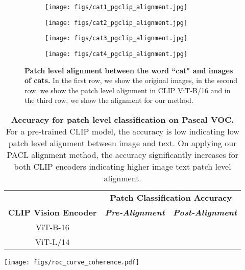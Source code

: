 \documentclass[10pt,twocolumn,letterpaper]{article}
\begin{document}
\begin{figure}[!t]
    \begin{subfigure}{0.25\linewidth}
        \centering
        \texttt{[image: figs/cat1\_pgclip\_alignment.jpg]}
\end{subfigure}
    \begin{subfigure}{0.25\linewidth}
        \centering
        \texttt{[image: figs/cat2\_pgclip\_alignment.jpg]}
\end{subfigure}
    \begin{subfigure}{0.28\linewidth}
        \centering
        \texttt{[image: figs/cat3\_pgclip\_alignment.jpg]}
\end{subfigure}
    \begin{subfigure}{0.14\linewidth}
        \centering
        \texttt{[image: figs/cat4\_pgclip\_alignment.jpg]}
\end{subfigure}
    \vspace{-2mm}
    \caption{\textbf{Patch level alignment between the word ``cat" and images of cats.} In the first row, we show the original images, in the second row, we show the patch level alignment in CLIP ViT-B/16 and in the third row, we show the alignment for our method.}
    \vspace{-4mm}
    \label{fig:alignment_qualitative}
\end{figure}



\begin{table}
    \centering
    \begin{minipage}{0.6\linewidth}
    \centering
    \scriptsize
    \resizebox{\linewidth}{!}
    {
    \begin{tabular}{ccc}
    \toprule
    & \multicolumn{2}{c}{\textbf{Patch Classification Accuracy}} \\
    \textbf{CLIP Vision Encoder} & \textbf{\textit{Pre-Alignment}} & \textbf{\textit{Post-Alignment}} \\
    \midrule
    ViT-B-16 &  &  \\
    ViT-L/14 &  &  \\
    \bottomrule
    \end{tabular}
    }
    \caption{\textbf{Accuracy for patch level classification on Pascal VOC.} For a pre-trained CLIP model, the accuracy is low indicating low patch level alignment between image and text. On applying our PACL alignment method, the accuracy significantly increases for both CLIP encoders indicating higher image text patch level alignment.}
    \label{table:alignment_quantitative}
    \end{minipage} \hfill
    \begin{minipage}{0.37\linewidth}
        \centering
        \texttt{[image: figs/roc\_curve\_coherence.pdf]}
        \label{fig:roc_coherence}
    \end{minipage}
\end{table}
\end{document}
